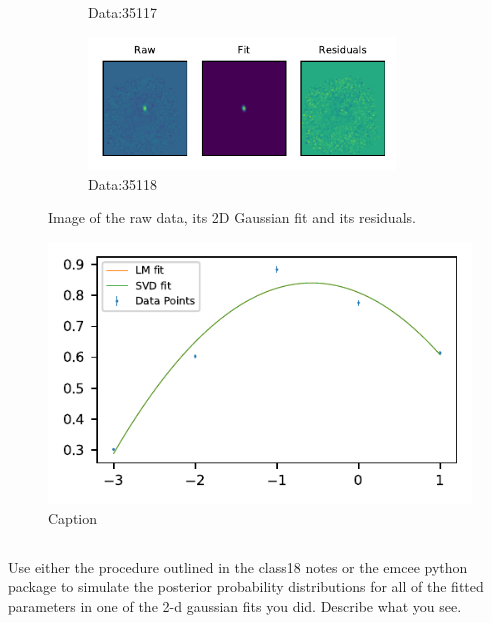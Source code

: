 \begin{figure}
\begin{subfigure}[b]{.5\textwidth}
        \caption{Data:35117}
        \label{fig:lmtFit7}
    \end{subfigure}
    \begin{subfigure}[b]{.5\textwidth}
        \centering
        \includegraphics[height=100pt]{CodeAndFigures/DataFits8.pdf}
        \caption{Data:35118}
        \label{fig:lmtFit8}
    \end{subfigure}
    \caption{Image of the raw data, its 2D Gaussian fit and its residuals.}
    \label{fig:lmtRaw}
\end{figure}


\begin{figure}
    \centering
    \includegraphics{CodeAndFigures/QuadFitPlot.pdf}
    \caption{Caption}
    \label{fig:lmtquadfit}
\end{figure}

\subsection{}

Use either the procedure outlined in the class18 notes or the emcee
python package to simulate the posterior probability distributions for all of the fitted parameters
in one of the 2-d gaussian fits you did. Describe what you see.